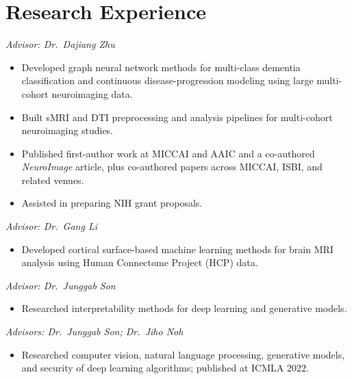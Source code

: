 \section{Research Experience}
\textit{Advisor: Dr.\ Dajiang Zhu}
\begin{itemize}
  \item Developed graph neural network methods for multi-class dementia classification and
        continuous disease-progression modeling using large multi-cohort neuroimaging data.
  \item Built sMRI and DTI preprocessing and analysis pipelines for multi-cohort
        neuroimaging studies.
  \item Published first-author work at MICCAI and AAIC and a co-authored \textit{NeuroImage}
        article, plus co-authored papers across MICCAI, ISBI, and related venues.
  \item Assisted in preparing NIH grant proposals.
\end{itemize}
\vspace{4pt}
\textit{Advisor: Dr.\ Gang Li}
\begin{itemize}
  \item Developed cortical surface-based machine learning methods for brain MRI analysis
        using Human Connectome Project (HCP) data.
\end{itemize}
\vspace{4pt}
\textit{Advisor: Dr.\ Junggab Son}
\begin{itemize}
  \item Researched interpretability methods for deep learning and generative models.
\end{itemize}
\vspace{4pt}
\textit{Advisors: Dr.\ Junggab Son; Dr.\ Jiho Noh}
\begin{itemize}
  \item Researched computer vision, natural language processing, generative models, and
        security of deep learning algorithms; published at ICMLA 2022.
\end{itemize}
